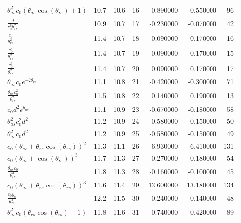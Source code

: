 \begin{tabularx}{\textwidth}{lllrrrr}
$ \theta_{as}^{2} c_{0} \left(\theta_{as} \cos{\left(\theta_{rs} \right)} + 1\right) $  &  10.7  &  10.6  &  16  &  -0.890000  &  -0.550000  &  96  \\ 
$ \displaystyle\frac{d}{c_{0}^{6} \theta_{rs}^{2}} $  &  10.9  &  10.7  &  17  &  -0.230000  &  -0.070000  &  42  \\ 
$ \displaystyle\frac{c_{0}}{\theta_{rs}^{2}} $  &  11.4  &  10.7  &  18  &  0.090000  &  0.170000  &  16  \\ 
$ \displaystyle\frac{c_{0}^{2}}{\theta_{rs}^{2}} $  &  11.4  &  10.7  &  19  &  0.090000  &  0.170000  &  15  \\ 
$ \displaystyle\frac{c_{0}^{6}}{\theta_{rs}^{2}} $  &  11.4  &  10.7  &  20  &  0.090000  &  0.170000  &  17  \\ 
$ \theta_{as} c_{0} e^{- 2 \theta_{rs}} $  &  11.1  &  10.8  &  21  &  -0.420000  &  -0.300000  &  71  \\ 
$ \displaystyle\frac{\theta_{as} c_{0}^{2}}{\theta_{rs}^{2}} $  &  11.5  &  10.8  &  22  &  0.140000  &  0.190000  &  13  \\ 
$ c_{0} d^{2} e^{\theta_{as}} $  &  11.1  &  10.9  &  23  &  -0.670000  &  -0.180000  &  58  \\ 
$ \theta_{as}^{2} c_{0}^{2} d^{2} $  &  11.2  &  10.9  &  24  &  -0.580000  &  -0.150000  &  50  \\ 
$ \theta_{as}^{2} c_{0} d^{2} $  &  11.2  &  10.9  &  25  &  -0.580000  &  -0.150000  &  49  \\ 
$ c_{0} \left(\theta_{as} + \theta_{rs} \cos{\left(\theta_{rs} \right)}\right)^{2} $  &  11.3  &  11.1  &  26  &  -6.930000  &  -6.410000  &  131  \\ 
$ c_{0} \left(\theta_{as} + \cos{\left(\theta_{rs} \right)}\right)^{3} $  &  11.7  &  11.3  &  27  &  -0.270000  &  -0.180000  &  54  \\ 
$ \displaystyle\frac{\theta_{as} c_{0}}{\theta_{rs}^{3}} $  &  11.8  &  11.3  &  28  &  -0.160000  &  -0.100000  &  45  \\ 
$ c_{0} \left(\theta_{as} + \theta_{rs} \cos{\left(\theta_{rs} \right)}\right)^{3} $  &  11.6  &  11.4  &  29  &  -13.600000  &  -13.180000  &  134  \\ 
$ \displaystyle\frac{c_{0} y_c}{\theta_{rs}^{3}} $  &  12.2  &  11.5  &  30  &  -0.240000  &  -0.140000  &  48  \\ 
$ \theta_{as}^{2} c_{0} \left(\theta_{rs} \cos{\left(\theta_{rs} \right)} + 1\right) $  &  11.8  &  11.6  &  31  &  -0.740000  &  -0.420000  &  89  \\ 

\end{tabularx}

